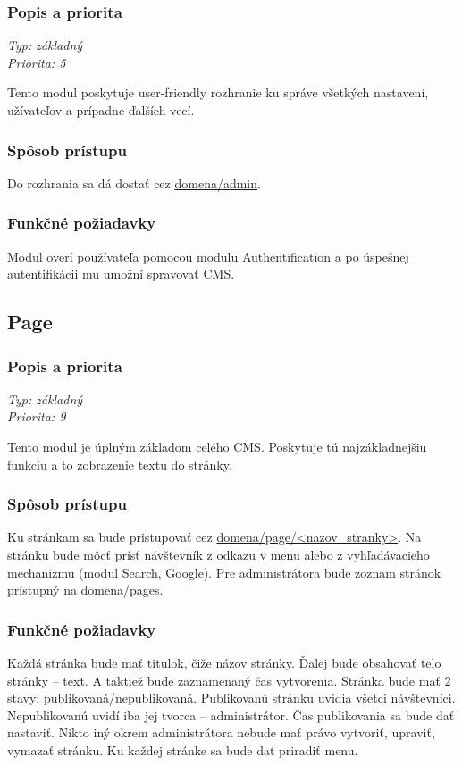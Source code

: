 \documentclass[a4paper,titlepage,11pt]{article}
\begin{document}
\subsubsection{Popis a priorita}
\begin{flushleft}
 \emph{Typ: základný}\\
 \emph{Priorita: 5}\\
\end{flushleft}
Tento modul poskytuje user-friendly rozhranie ku správe všetkých nastavení, užívateľov a prípadne ďalších vecí. 
\subsubsection{Spôsob prístupu}
Do rozhrania sa dá dostať cez \url{domena/admin}.
\subsubsection{Funkčné požiadavky}
Modul overí používateľa pomocou modulu Authentification a po úspešnej autentifikácii mu umožní spravovať CMS.

\subsection{Page}
\subsubsection{Popis a priorita}
\begin{flushleft}
 \emph{Typ: základný}\\
 \emph{Priorita: 9}\\
\end{flushleft}
Tento modul je úplným základom celého CMS. Poskytuje tú najzákladnejšiu funkciu a to zobrazenie textu do stránky. 
\subsubsection{Spôsob prístupu}
Ku stránkam sa bude pristupovať cez \url{domena/page/<nazov_stranky>}.
Na stránku bude môcť prísť návštevník z odkazu v menu alebo z vyhľadávacieho mechanizmu (modul Search, Google). 
Pre administrátora bude zoznam stránok prístupný na domena/pages.
\subsubsection{Funkčné požiadavky}
Každá stránka bude mať titulok, čiže názov stránky. Ďalej bude obsahovať telo stránky -- text. 
A taktiež bude zaznamenaný čas vytvorenia. Stránka bude mať 2 stavy: publikovaná\slash nepublikovaná. 
Publikovanú stránku uvidia všetci návštevníci. Nepublikovanú uvidí iba jej tvorca -- administrátor. 
Čas publikovania sa bude dať nastaviť. Nikto iný okrem administrátora nebude mať právo vytvoriť, upraviť, vymazať stránku. 
Ku každej stránke sa bude dať priradiť menu.
\end{document}
